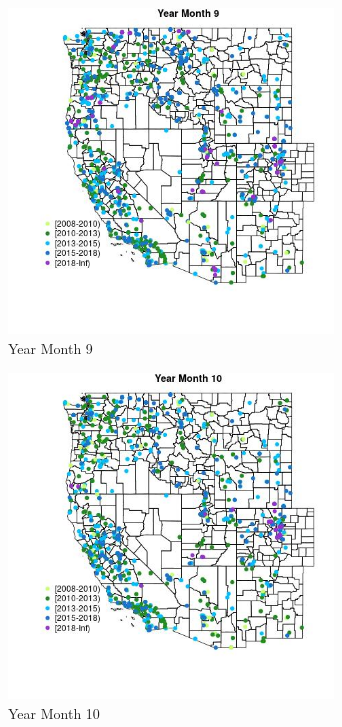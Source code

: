 \begin{figure} 
\centering  
\includegraphics[width=0.77\textwidth]{Code_Outputs/Report_ML_input_PM25_Step4_part_e_de_duplicated_aveswNAs_MapObsMo9Year.jpg} 
\caption{\label{fig:Report_ML_input_PM25_Step4_part_e_de_duplicated_aveswNAsMapObsMo9Year}Year Month 9} 
\end{figure} 
 

\clearpage 

\begin{figure} 
\centering  
\includegraphics[width=0.77\textwidth]{Code_Outputs/Report_ML_input_PM25_Step4_part_e_de_duplicated_aveswNAs_MapObsMo10Year.jpg} 
\caption{\label{fig:Report_ML_input_PM25_Step4_part_e_de_duplicated_aveswNAsMapObsMo10Year}Year Month 10} 
\end{figure} 
 

